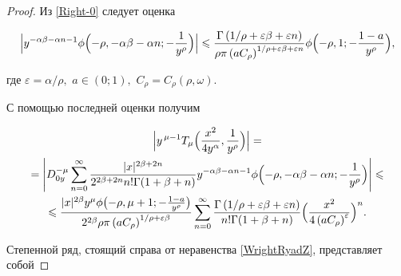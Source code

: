 \begin{proof}

Из \eqref{Right-0} следует оценка

$$

\Bigl| y^{-\alpha\beta-\alpha n-1} \phi\Bigl(-\rho,-\alpha\beta-\alpha n; -\frac{1}{y^{\rho}}\Bigr)\Bigr|

\leqslant

 \frac{\Gamma\left( 1/\rho+\varepsilon\beta+\varepsilon n\right)}{ \rho \pi\left(aC_{\rho} \right)^{1/\rho+\varepsilon\beta+\varepsilon n}}

\phi\Bigl(-\rho,1; -\frac{1-a}{y^{\rho}}\Bigr),

$$

где $\varepsilon=\alpha/\rho,$ $a\in(0;1),$ $C_{\rho}=C_{\rho}(\rho,\omega).$



С помощью последней оценки получим

\begin{multline}

\Bigl| y^{\,\mu-1} T_{\mu}\Bigl(\frac{x^2}{4y^{\alpha}},\frac{1}{y^{\rho}}\Bigr)\Bigr|=

\\

=\left|

 D_{0y}^{-\mu}

  \sum\limits_{n=0}^{\infty}\frac{|x|^{2\beta+2n}}{ 2^{2\beta+2n}n! \Gamma(1+\beta+n)}

y^{-\alpha\beta-\alpha n-1}\phi \Bigl(-\rho,-\alpha\beta-\alpha n; -\frac{1}{y^{\rho}}\Bigr)

 \right|\leqslant

\\

 \label{WrightRyadZ}  

\leqslant

\frac{ |x|^{2\beta}y^{\mu}\phi\bigl(-\rho,\mu+1; -\frac{1-a}{y^{\rho}}\bigr)}{2^{2\beta}\rho \pi \left(aC_{\rho} \right)^{1/\rho+\varepsilon\beta}}

\sum\limits_{n=0}^{\infty}

\frac{\Gamma\left(1/\rho+\varepsilon\beta+\varepsilon n\right)}{n!

\Gamma(1+\beta+n)}

\Bigl( \frac{x^2}{4\left(aC_{\rho} \right)^{\varepsilon}}\Bigr)^{n}.

\end{multline}



Степенной ряд, стоящий справа от неравенства \eqref{WrightRyadZ}, представляет собой 


\end{proof}
